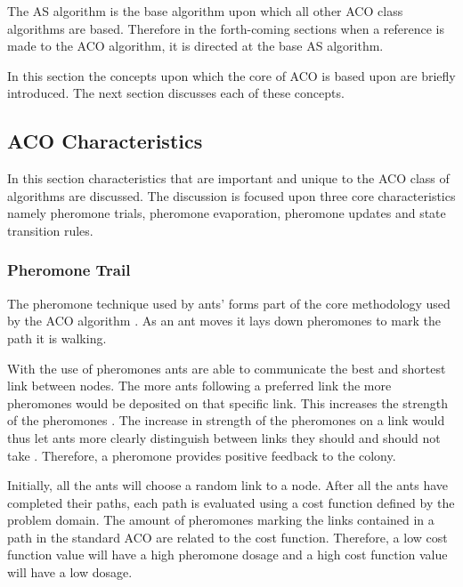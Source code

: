 The \gls{AS} algorithm is the base algorithm upon which all other \gls{ACO} class algorithms are based. Therefore in the forth-coming sections when a reference is made to the \gls{ACO} algorithm, it is directed at the base \gls{AS} algorithm.

In this section the concepts  upon which the core of \gls{ACO} is based upon are briefly introduced. The next section discusses each of these concepts.
\subsection{ACO Characteristics}
\label{sec:ACOcharacter}
In this section characteristics that are important and unique to the \gls{ACO} class of algorithms are discussed. The discussion is focused upon three core characteristics namely pheromone trials, pheromone evaporation, pheromone updates and state transition rules.
\subsubsection{Pheromone Trail}
\label{sec:pheromonetrail}
The pheromone technique used by ants' forms part of the core methodology used by the \gls{ACO} algorithm \cite{AntQAP}. As an ant moves it lays down pheromones to mark the path it is walking.

With the use of pheromones ants are able to communicate the best and shortest link between nodes\cite{AntQAP,AntsAndStigmergy,CompuIntelligenceIntro}. The more ants following a preferred link the more pheromones would be deposited on that specific link. This increases the strength of the pheromones \cite{ImpACOComplex}. The increase in strength of the pheromones on a link would thus let ants more clearly distinguish between links they should and should not take \cite{ImpACOComplex}. Therefore, a pheromone provides positive feedback to the colony\cite{AntQAP,AntsAndStigmergy,CompuIntelligenceIntro}.

Initially, all the ants will choose a random link to a node\cite{AntQAP,AntsAndStigmergy,CompuIntelligenceIntro}. After all the ants have completed their paths, each path is evaluated using a cost function defined by the problem domain\cite{CompuIntelligenceIntro}. The amount of pheromones marking the links contained in a path in the standard \gls{ACO} are related to the cost function\cite{AntQAP,AntsAndStigmergy,CompuIntelligenceIntro}. Therefore, a low cost function value will have a high pheromone dosage and a high cost function value will have a low dosage\cite{CompuIntelligenceIntro}. 

